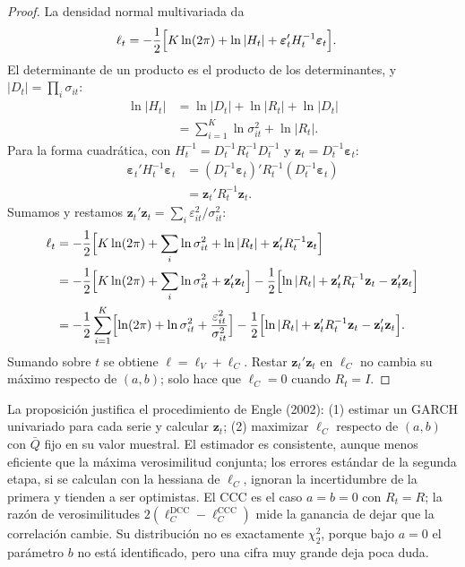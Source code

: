 \begin{proof}
La densidad normal multivariada da
\begin{align*}
  \ell_t &= -\frac12\Bigl[K\ln(2\pi)+\ln|H_t|+\boldsymbol\varepsilon_t'H_t^{-1}\boldsymbol\varepsilon_t\Bigr].
\end{align*}
El determinante de un producto es el producto de los determinantes, y $|D_t|=\prod_i\sigma_{it}$:
\begin{align*}
  \ln|H_t| &= \ln|D_t|+\ln|R_t|+\ln|D_t|\\
           &= \sum_{i=1}^{K}\ln\sigma_{it}^2+\ln|R_t| .
\end{align*}
Para la forma cuadrática, con $H_t^{-1}=D_t^{-1}R_t^{-1}D_t^{-1}$ y $\mathbf z_t=D_t^{-1}\boldsymbol\varepsilon_t$:
\begin{align*}
  \boldsymbol\varepsilon_t'H_t^{-1}\boldsymbol\varepsilon_t &= (D_t^{-1}\boldsymbol\varepsilon_t)'R_t^{-1}(D_t^{-1}\boldsymbol\varepsilon_t)\\
                                                           &= \mathbf z_t'R_t^{-1}\mathbf z_t .
\end{align*}
Sumamos y restamos $\mathbf z_t'\mathbf z_t=\sum_i\varepsilon_{it}^2/\sigma_{it}^2$:
\begin{align*}
  \ell_t &= -\frac12\Bigl[K\ln(2\pi)+\sum_i\ln\sigma_{it}^2+\ln|R_t|+\mathbf z_t'R_t^{-1}\mathbf z_t\Bigr]\\
         &= -\frac12\Bigl[K\ln(2\pi)+\sum_i\ln\sigma_{it}^2+\mathbf z_t'\mathbf z_t\Bigr]
            -\frac12\Bigl[\ln|R_t|+\mathbf z_t'R_t^{-1}\mathbf z_t-\mathbf z_t'\mathbf z_t\Bigr]\\
         &= -\frac12\sum_{i=1}^{K}\Bigl[\ln(2\pi)+\ln\sigma_{it}^2+\frac{\varepsilon_{it}^2}{\sigma_{it}^2}\Bigr]
            -\frac12\Bigl[\ln|R_t|+\mathbf z_t'R_t^{-1}\mathbf z_t-\mathbf z_t'\mathbf z_t\Bigr].
\end{align*}
Sumando sobre $t$ se obtiene $\ell=\ell_V+\ell_C$. Restar $\mathbf z_t'\mathbf z_t$ en $\ell_C$ no cambia su
máximo respecto de $(a,b)$; solo hace que $\ell_C=0$ cuando $R_t=I$.
\end{proof}

La proposición justifica el procedimiento de Engle (2002): (1) estimar un GARCH univariado para cada serie y
calcular $\mathbf z_t$; (2) maximizar $\ell_C$ respecto de $(a,b)$ con $\bar Q$ fijo en su valor muestral. El
estimador es consistente, aunque menos eficiente que la máxima verosimilitud conjunta; los errores estándar de
la segunda etapa, si se calculan con la hessiana de $\ell_C$, ignoran la incertidumbre de la primera y tienden a
ser optimistas. El CCC es el caso $a=b=0$ con $R_t=R$; la razón de verosimilitudes $2(\ell_C^{\text{DCC}}-\ell_C^{\text{CCC}})$
mide la ganancia de dejar que la correlación cambie. Su distribución no es exactamente $\chi^2_2$, porque bajo
$a=0$ el parámetro $b$ no está identificado, pero una cifra muy grande deja poca duda.

